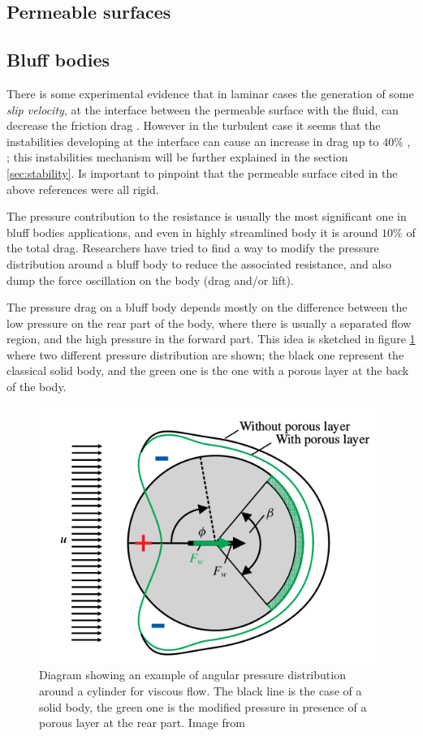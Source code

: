 \subsection{Permeable surfaces}

\subsection{Bluff bodies}

There is some experimental evidence that in laminar cases the generation of some \textit{slip velocity}, at the interface between the permeable surface with the fluid, can decrease the friction drag \citet{beavers1967boundary}.
However in the turbulent case it seems that the instabilities developing at the interface can cause an increase in drag up to $40\%$ \citet{jimenez2001turbulent}, \citet{breugem2006influence}; this instabilities mechanism will be further explained in the section \ref{sec:stability}.
Is important to pinpoint that the permeable surface cited in the above references were all rigid.

The pressure contribution to the resistance is usually the most significant one in bluff bodies applications, and even in highly streamlined body it is around $10\%$ of the total drag.
Researchers have tried to find a way to modify the pressure distribution around a bluff body to reduce the associated resistance, and also dump the force oscillation on the body (drag and/or lift).

The pressure drag on a bluff body depends mostly on the difference between the low pressure on the rear part of the body, where there is usually a separated flow region, and the high pressure in the forward part.
This idea is sketched in figure \ref{fig:pressure_dist} where two different pressure distribution are shown; the black one represent the classical solid body, and the green one is the one with a porous layer at the back of the body.

\begin{figure}[h]
	\centering
	\includegraphics[width=0.4\linewidth]{chapter_1/pressure_dist}
	\caption{Diagram showing an example of angular pressure distribution around a cylinder for viscous flow. The black line is the case of a solid body, the green one is the modified pressure in presence of a porous layer at the rear part. Image from \citet{klausmann2017drag}}
	\label{fig:pressure_dist}
\end{figure}

